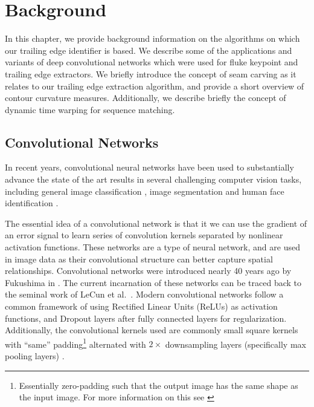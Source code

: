  
\chapter{Background} \label{sec:background}

In this chapter, we provide background information on the algorithms on which our trailing edge identifier is based.
We describe some of the applications and variants of deep convolutional networks which were used for fluke keypoint and trailing edge extractors.
We briefly introduce the concept of seam carving as it relates to our trailing edge extraction algorithm, and provide a short overview of contour curvature measures.
Additionally, we describe briefly the concept of dynamic time warping for sequence matching.

\section{Convolutional Networks}

In recent years, convolutional neural networks have been used to substantially advance the state of the art results in several challenging computer vision tasks, including general image classification \cite{krizhevsky2012imagenet, szegedy2015going}, image segmentation \cite{long2015fully, chen2014semantic} and human face identification \cite{fan2014learning, schroff2015facenet}.

The essential idea of a convolutional network is that it we can use the gradient of an error signal to learn series of convolution kernels separated by nonlinear activation functions.
These networks are a type of neural network, and are used in image data as their convolutional structure can better capture spatial relationships.
Convolutional networks were introduced nearly 40 years ago by Fukushima in \cite{fukushima1979neural}.
The current incarnation of these networks can be traced back to the seminal work of LeCun et al.\ \cite{lecun1998gradient}.
Modern convolutional networks follow a common framework of using Rectified Linear Units (ReLUs) as activation functions, and Dropout \cite{hinton2012improving} layers after fully connected layers for regularization.
Additionally, the convolutional kernels used are commonly small square kernels with ``same'' padding\footnote{Essentially zero-padding such that the output image has the same shape as the input image. For more information on this see \cite{dumoulin2016guide}} alternated with $2\times$ downsampling layers (specifically max pooling layers) \cite{simonyan2014very, sermanet2013overfeat, krizhevsky2012imagenet}.

